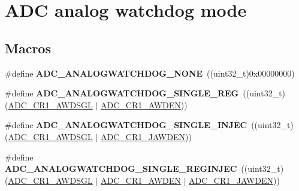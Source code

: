 \hypertarget{group___a_d_c__analog__watchdog__mode}{\section{A\-D\-C analog watchdog mode}
\label{group___a_d_c__analog__watchdog__mode}
}
\subsection*{Macros}
\begin{DoxyCompactItemize}
\item 
\hypertarget{group___a_d_c__analog__watchdog__mode_gad173f9dd01d4585c9b7c8c324de399c0}{\#define {\bfseries A\-D\-C\-\_\-\-A\-N\-A\-L\-O\-G\-W\-A\-T\-C\-H\-D\-O\-G\-\_\-\-N\-O\-N\-E}~((uint32\-\_\-t)0x00000000)}\label{group___a_d_c__analog__watchdog__mode_gad173f9dd01d4585c9b7c8c324de399c0}

\item 
\hypertarget{group___a_d_c__analog__watchdog__mode_gad4cf176e721fd2382fbc7937e352db67}{\#define {\bfseries A\-D\-C\-\_\-\-A\-N\-A\-L\-O\-G\-W\-A\-T\-C\-H\-D\-O\-G\-\_\-\-S\-I\-N\-G\-L\-E\-\_\-\-R\-E\-G}~((uint32\-\_\-t)(\hyperlink{group___peripheral___registers___bits___definition_ga5c9fc31f19c04033dfa98e982519c451}{A\-D\-C\-\_\-\-C\-R1\-\_\-\-A\-W\-D\-S\-G\-L} $\vert$ \hyperlink{group___peripheral___registers___bits___definition_ga6e006d43fcb9fe1306745c95a1bdd651}{A\-D\-C\-\_\-\-C\-R1\-\_\-\-A\-W\-D\-E\-N}))}\label{group___a_d_c__analog__watchdog__mode_gad4cf176e721fd2382fbc7937e352db67}

\item 
\hypertarget{group___a_d_c__analog__watchdog__mode_ga47d8850a833f799ceb433491a3d6659c}{\#define {\bfseries A\-D\-C\-\_\-\-A\-N\-A\-L\-O\-G\-W\-A\-T\-C\-H\-D\-O\-G\-\_\-\-S\-I\-N\-G\-L\-E\-\_\-\-I\-N\-J\-E\-C}~((uint32\-\_\-t)(\hyperlink{group___peripheral___registers___bits___definition_ga5c9fc31f19c04033dfa98e982519c451}{A\-D\-C\-\_\-\-C\-R1\-\_\-\-A\-W\-D\-S\-G\-L} $\vert$ \hyperlink{group___peripheral___registers___bits___definition_ga4886de74bcd3a1e545094089f76fd0b3}{A\-D\-C\-\_\-\-C\-R1\-\_\-\-J\-A\-W\-D\-E\-N}))}\label{group___a_d_c__analog__watchdog__mode_ga47d8850a833f799ceb433491a3d6659c}

\item 
\hypertarget{group___a_d_c__analog__watchdog__mode_gaa0c246b49622fa85c7df6e11f583dffb}{\#define {\bfseries A\-D\-C\-\_\-\-A\-N\-A\-L\-O\-G\-W\-A\-T\-C\-H\-D\-O\-G\-\_\-\-S\-I\-N\-G\-L\-E\-\_\-\-R\-E\-G\-I\-N\-J\-E\-C}~((uint32\-\_\-t)(\hyperlink{group___peripheral___registers___bits___definition_ga5c9fc31f19c04033dfa98e982519c451}{A\-D\-C\-\_\-\-C\-R1\-\_\-\-A\-W\-D\-S\-G\-L} $\vert$ \hyperlink{group___peripheral___registers___bits___definition_ga6e006d43fcb9fe1306745c95a1bdd651}{A\-D\-C\-\_\-\-C\-R1\-\_\-\-A\-W\-D\-E\-N} $\vert$ \hyperlink{group___peripheral___registers___bits___definition_ga4886de74bcd3a1e545094089f76fd0b3}{A\-D\-C\-\_\-\-C\-R1\-\_\-\-J\-A\-W\-D\-E\-N}))}\label{group___a_d_c__analog__watchdog__mode_gaa0c246b49622fa85c7df6e11f583dffb}


\end{DoxyCompactItemize}
